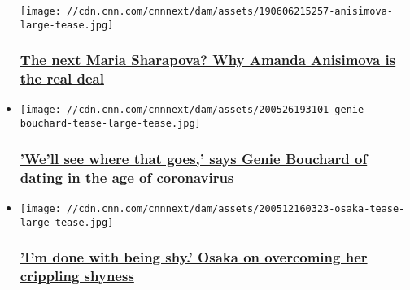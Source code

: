 \begin{itemize}
  \texttt{[image: //cdn.cnn.com/cnnnext/dam/assets/190606215257-anisimova-large-tease.jpg]}

  \hypertarget{the-next-maria-sharapova-why-amanda-anisimova-is-the-real-deal}{%
  \subsubsection{\texorpdfstring{\href{/2020/06/22/tennis/amanda-anisimova-maria-sharapova-2-0-spt-intl/index.html}{The
  next Maria Sharapova? Why Amanda Anisimova is the real
  deal}}{The next Maria Sharapova? Why Amanda Anisimova is the real deal}}\label{the-next-maria-sharapova-why-amanda-anisimova-is-the-real-deal}}
\item
  \href{/2020/05/26/tennis/genie-bouchard-instagram-live-dating-spt-intl/index.html}{}

  \texttt{[image: //cdn.cnn.com/cnnnext/dam/assets/200526193101-genie-bouchard-tease-large-tease.jpg]}

  \hypertarget{well-see-where-that-goes-says-genie-bouchard-of-dating-in-the-age-of-coronavirus}{%
  \subsubsection{\texorpdfstring{\href{/2020/05/26/tennis/genie-bouchard-instagram-live-dating-spt-intl/index.html}{'We'll
  see where that goes,' says Genie Bouchard of dating in the age of
  coronavirus}}{'We'll see where that goes,' says Genie Bouchard of dating in the age of coronavirus}}\label{well-see-where-that-goes-says-genie-bouchard-of-dating-in-the-age-of-coronavirus}}
\item
  \href{/2020/05/13/tennis/naomi-osaka-time-out-tennis-spt-intl/index.html}{}

  \texttt{[image: //cdn.cnn.com/cnnnext/dam/assets/200512160323-osaka-tease-large-tease.jpg]}

  \hypertarget{im-done-with-being-shy-osaka-on-overcoming-her-crippling-shyness}{%
  \subsubsection{\texorpdfstring{\href{/2020/05/13/tennis/naomi-osaka-time-out-tennis-spt-intl/index.html}{'I'm
  done with being shy.' Osaka on overcoming her crippling
  shyness}}{'I'm done with being shy.' Osaka on overcoming her crippling shyness}}\label{im-done-with-being-shy-osaka-on-overcoming-her-crippling-shyness}}
\end{itemize}

